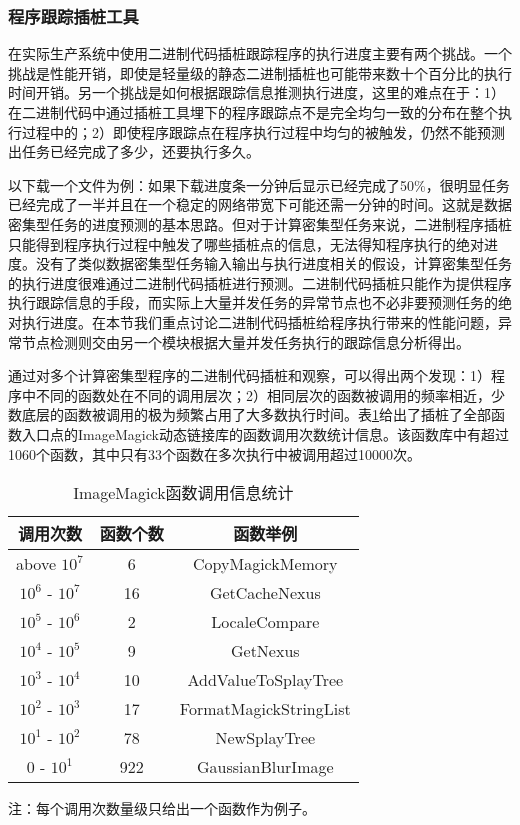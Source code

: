\subsubsection{程序跟踪插桩工具}
\label{subsec:no2_inst}
在实际生产系统中使用二进制代码插桩跟踪程序的执行进度主要有两个挑战。一个挑战是性能开销，即使是轻量级的静态二进制插桩也可能带来数十个百分比的执行时间开销。另一个挑战是如何根据跟踪信息推测执行进度，这里的难点在于：1）在二进制代码中通过插桩工具埋下的程序跟踪点不是完全均匀一致的分布在整个执行过程中的；2）即使程序跟踪点在程序执行过程中均匀的被触发，仍然不能预测出任务已经完成了多少，还要执行多久。

以下载一个文件为例：如果下载进度条一分钟后显示已经完成了50\%，很明显任务已经完成了一半并且在一个稳定的网络带宽下可能还需一分钟的时间。这就是数据密集型任务的进度预测的基本思路。但对于计算密集型任务来说，二进制程序插桩只能得到程序执行过程中触发了哪些插桩点的信息，无法得知程序执行的绝对进度。没有了类似数据密集型任务输入输出与执行进度相关的假设，计算密集型任务的执行进度很难通过二进制代码插桩进行预测。二进制代码插桩只能作为提供程序执行跟踪信息的手段，而实际上大量并发任务的异常节点也不必非要预测任务的绝对执行进度。在本节我们重点讨论二进制代码插桩给程序执行带来的性能问题，异常节点检测则交由另一个模块根据大量并发任务执行的跟踪信息分析得出。

通过对多个计算密集型程序的二进制代码插桩和观察，可以得出两个发现：1）程序中不同的函数处在不同的调用层次；2）相同层次的函数被调用的频率相近，少数底层的函数被调用的极为频繁占用了大多数执行时间。表\ref{table:inst-stats}给出了插桩了全部函数入口点的ImageMagick动态链接库的函数调用次数统计信息。该函数库中有超过1060个函数，其中只有33个函数在多次执行中被调用超过10000次。
\begin{table}
\centering
\begin{threeparttable}
\caption{ImageMagick函数调用信息统计}
\label{table:inst-stats}
\begin{tabular}{c|c|c}
\hline
调用次数 & 函数个数 & 函数举例 \\
\hline
above $10^7$ & 6 & CopyMagickMemory \\
$10^6$ - $10^7$ & 16 & GetCacheNexus \\
$10^5$ - $10^6$ & 2 & LocaleCompare \\
$10^4$ - $10^5$ & 9 & GetNexus \\
$10^3$ - $10^4$ & 10 & AddValueToSplayTree \\
$10^2$ - $10^3$ & 17 & FormatMagickStringList \\
$10^1$ - $10^2$ & 78 & NewSplayTree \\
$0$    - $10^1$ & 922 & GaussianBlurImage \\
\hline
\end{tabular}
\small 注：每个调用次数量级只给出一个函数作为例子。 
\end{threeparttable}
\end{table}

